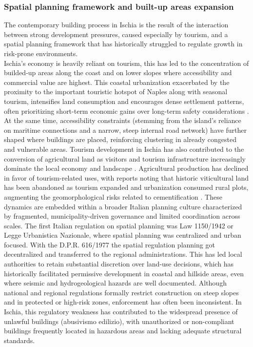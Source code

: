 \documentclass[10pt, twocolumn, twoside]{article}
\begin{document}
\subsubsection{Spatial planning framework and built-up areas expansion
}The contemporary building process in Ischia is the result of the interaction between strong development pressures, caused especially by tourism, and a spatial planning framework that has historically struggled to regulate growth in risk-prone environments.\\
Ischia’s economy is heavily reliant on tourism, this has led to the concentration of builded-up areas along the coast and on lower slopes where accessibility and commercial value are highest. This coastal urbanization exacerbated by the proximity to the important touristic hotspot of Naples along with seasonal tourism, intensifies land consumption and encourages dense settlement patterns, often prioritizing short-term economic gains over long-term safety considerations \cite{land12051017} . At the same time, accessibility constraints (stemming from the island’s reliance on maritime connections and a narrow, steep internal road network) have further shaped where buildings are placed, reinforcing clustering in already congested and vulnerable areas. Tourism development in Ischia has also contributed to the conversion of agricultural land as visitors and tourism infrastructure increasingly dominate the local economy and landscape . Agricultural production has declined in favor of tourism‑related uses, with reports noting that historic viticultural land has been abandoned as tourism expanded and urbanization consumed rural plots, augmenting the geomorphological risks related to cementification \cite{Aveta2019Ischia}.
These dynamics are embedded within a broader Italian planning culture characterized by fragmented, municipality-driven governance and limited coordination across scales. The first Italian regulation on spatial planning was Law 1150/1942 or Legge Urbanistica Nazionale, where spatial planning was centralized and urban focused. With the D.P.R. 616/1977 the spatial regulation planning got decentralized and transferred to the regional administrations. This has led local authorities to retain substantial discretion over land-use decisions, which has historically facilitated permissive development in coastal and hillside areas, even where seismic and hydrogeological hazards are well documented. Although national and regional regulations formally restrict construction on steep slopes and in protected or high-risk zones, enforcement has often been inconsistent. In Ischia, this regulatory weakness has contributed to the widespread presence of unlawful buildings (abusivismo edilizio), with unauthorized or non-compliant buildings frequently located in hazardous areas and lacking adequate structural standards.
\end{document}
